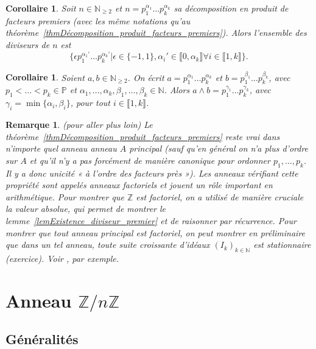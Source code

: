 \documentclass[12pt]{report}
\newtheorem*{rem}{Remarque}
\newtheorem{Cor}[thm]{Corollaire}
\newcommand{\N}{\mathbb{N}}
\newcommand{\Z}{\mathbb{Z}}
\begin{document}
\begin{Cor}
Soit $n\in \N_{\geq 2}$ et $n=p_1^{\alpha_1}\ldots p_k^{\alpha_k}$ sa décomposition en produit de facteurs premiers (avec les même notations qu'au théorème~\ref{thmDécomposition_produit_facteurs_premiers}). Alors l'ensemble des diviseurs de $n$ est \[\{\epsilon p_1^{\alpha_1'}\ldots p_k^{\alpha_k'}|\epsilon\in \{-1,1\}, \alpha_i'\in \llbracket 0,\alpha_k\rrbracket\forall i\in \llbracket 1,k\rrbracket\}.\]
\end{Cor}

\begin{Cor}\label{corExpression_PGCD}
Soient $a,b\in \N_{\geq 2}$. On écrit $a=p_1^{\alpha_1}\ldots p_k^{\alpha_k}$ et $b=p_1^{\beta_1}\ldots p_{k}^{\beta_k}$, avec $p_1<\ldots <p_k\in \mathbb{P}$ et $\alpha_1,\ldots,\alpha_k,\beta_1,\ldots,\beta_k\in \N$. Alors $a\wedge b=p_1^{\gamma_1}\ldots p_k^{\gamma_k}$, avec $\gamma_i=\min \{\alpha_i,\beta_i\}$, pour tout $i\in \llbracket 1,k\rrbracket$.
\end{Cor}

\begin{rem}(pour aller plus loin)
Le théorème~\ref{thmDécomposition_produit_facteurs_premiers} reste vrai dans n'importe quel anneau anneau $A$ principal (sauf qu'en général on n'a plus d'ordre sur $A$ et qu'il n'y a pas forcément de manière canonique pour ordonner $p_1,\ldots, p_k$. Il y a donc unicité « à l'ordre des facteurs près »). Les anneaux vérifiant cette propriété sont appelés anneaux factoriels et jouent un rôle important en arithmétique. Pour montrer que $\Z$ est factoriel, on a utilisé de manière cruciale la valeur absolue, qui permet de montrer le lemme~\ref{lemExistence_diviseur_premier} et de raisonner par récurrence. Pour montrer que tout anneau principal est factoriel, on peut montrer en préliminaire que dans un tel anneau, toute suite croissante d'idéaux $(I_k)_{k\in \N}$ est stationnaire (exercice). Voir \cite[Chapitre 11]{combes1998algebre}, par exemple.

\end{rem}


\chapter{Anneau $\mathbb{Z}/n \mathbb{Z}$}


\section{Généralités}
\end{document}
